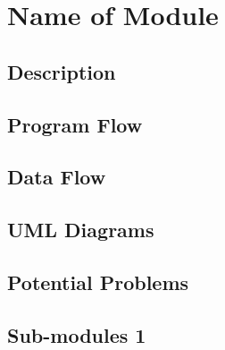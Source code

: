 
\chapter{Name of Module}

\section{Description}


\section{Program Flow}


\section{Data Flow}


\section{UML Diagrams}


\section{Potential Problems}


\section{Sub-modules 1}

